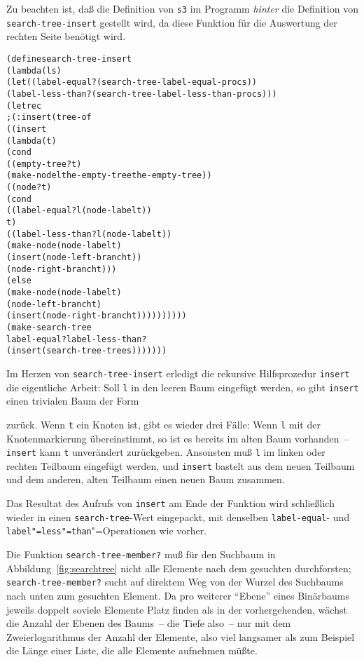 %
Zu beachten ist, daß die Definition von \texttt{s3} im Programm
\emph{hinter} die Definition von \texttt{search-tree-insert} gestellt
wird, da diese Funktion für die Auswertung der rechten Seite benötigt wird.
%
\begin{alltt}
(define search-tree-insert
  (lambda (l s)
    (let ((label-equal? (search-tree-label-equal-proc s))
          (label-less-than? (search-tree-label-less-than-proc s)))
      (letrec
          ; (: insert (tree-of %a) -> (tree-of %a))
          ((insert
            (lambda (t)
              (cond
               ((empty-tree? t)
                (make-node l the-empty-tree the-empty-tree))
               ((node? t)
                (cond
                  ((label-equal? l (node-label t))
                   t)
                  ((label-less-than? l (node-label t))
                   (make-node (node-label t)
                              (insert (node-left-branch t))
                              (node-right-branch t)))
                  (else
                   (make-node (node-label t)
                              (node-left-branch t)
                              (insert (node-right-branch t))))))))))
        (make-search-tree
         label-equal? label-less-than?
         (insert (search-tree-tree s)))))))
\end{alltt}
%
Im Herzen von \texttt{search-tree-insert} erledigt die rekursive
Hilfsprozedur \texttt{insert} die eigentliche Arbeit: Soll
\texttt{l} in den leeren Baum eingefügt werden, so gibt
\texttt{insert} einen trivialen Baum der Form
%
\begin{pspdf}
\begin{center}
    {\Tdot\Tdot}
\end{center}
\end{pspdf}
% 
zurück.  Wenn \texttt{t} ein Knoten ist, gibt es wieder drei Fälle:
Wenn \texttt{l} mit der
Knotenmarkierung übereinstimmt, so ist es bereits im alten Baum
vorhanden~-- \texttt{insert} kann \texttt{t} unverändert
zurückgeben.  Ansonsten muß
\texttt{l} im linken oder rechten Teilbaum eingefügt werden,
und \texttt{insert} bastelt aus dem neuen Teilbaum und dem anderen, alten Teilbaum
einen neuen Baum zusammen.

Das Resultat des Aufrufs von \texttt{insert} am Ende der Funktion wird
schließlich wieder in einen \texttt{search-tree}-Wert eingepackt,
mit denselben \texttt{label-equal}- und \texttt{label"=less"=than}"=Operationen wie vorher.

Die Funktion \texttt{search-tree-member?} muß für den Suchbaum in
Abbildung~\ref{fig:searchtree} nicht alle Elemente nach dem gesuchten
durchforsten; \texttt{search-tree-member?} sucht auf direktem Weg
von der Wurzel des Suchbaums nach unten zum gesuchten Element.  Da pro
weiterer "`Ebene"' eines Binärbaums jeweils doppelt soviele Elemente
Platz finden als in der vorhergehenden, wächst die Anzahl der Ebenen
des Baums~-- die Tiefe also~-- nur mit dem Zweierlogarithmus der
Anzahl der Elemente, also viel langsamer als zum Beispiel die Länge
einer Liste, die alle Elemente aufnehmen müßte.

